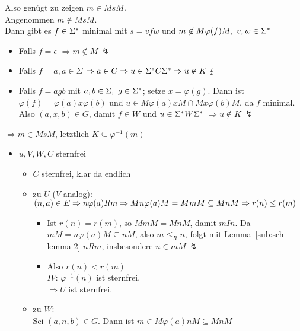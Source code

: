 \begin{itemize}
\begin{itemize}
            Also genügt zu zeigen $m\in MsM$.\\
            Angenommen $m\not\in MsM$.\\
            Dann gibt es $f\in\Sigma^*$ minimal mit $s=vfw$ und $m\not\in M\varphi(f)M,\ v,w\in\Sigmas$
            \begin{itemize}
                \item Falls $f=\epsilon$ $\Rightarrow m\not\in M\ \lightning$
                \item Falls $f=a,a\in \Sigma$ $\Rightarrow a\in C\Rightarrow u\in\Sigma^* C\Sigma^*\Rightarrow u\not\in K\ \lightning$
                \item Falls $f=agb$ mit $a,b\in\Sigma,\ g\in\Sigma^*$; setze $x=\varphi(g)$. Dann ist $\varphi(f)=\varphi(a)x\varphi(b)$ und $u\in M\varphi(a)xM\cap Mx\varphi(b)M$, da $f$ minimal. Also $(a,x,b)\in G$, damit $f\in W$ und $u \in\Sigma^* W\Sigma^*$ $\Rightarrow u\not\in K\ \lightning$
            \end{itemize}
            $\Rightarrow m\in MsM$, letztlich $K\subseteq \varphi^{-1}(m)$
        \end{itemize}
        \begin{itemize}
            \item $u,V,W,C$ sternfrei
            \begin{itemize}
                \item $C$ sternfrei, klar da endlich
                \item zu $U$ ($V$ analog):\\
                    $(n,a)\in E\Rightarrow n\varphi(a)Rm \Rightarrow Mn\varphi(a)M=MmM\subseteq MnM\\\Rightarrow r(n)\le r(m)$
                    \begin{itemize}
                        \item Ist $r(n)=r(m)$, so $MmM=MnM$, damit $mIn$. Da $mM=n\varphi(a)M\subseteq nM$, also $m\le_R n$, folgt mit Lemma~\ref{sub:sch-lemma-2} $nRm$, insbesondere $n\in mM\ \lightning$
                        \item Also $r(n)<r(m)$\\
                        $IV$: $\varphi^{-1}(n)$ ist sternfrei.\\
                        $\Rightarrow U$ ist sternfrei.
                    \end{itemize}
                \item zu $W$:\\
                    Sei $(a,n,b)\in G$. Dann ist $m\in M\varphi(a)nM\subseteq MnM$\\

\end{itemize}
\end{itemize}
\end{itemize}
